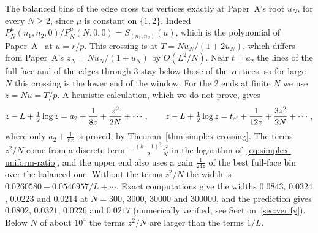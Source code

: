 \begin{remark}\label{rem:K3-finite}
The balanced bins of the edge cross the vertices exactly at Paper~A's root
$u_N$, for every $N\ge2$, since $\mu$ is constant on $\{1,2\}$. Indeed
$P^\mu_N(n_1,n_2,0)/P^\mu_N(N,0,0)=S_{(n_1,n_2)}(u)$, which is the polynomial of
Paper~A~\cite{paperA} at $u=r/p$. This crossing is at $T=Nu_N/(1+2u_N)$, which
differs from Paper~A's $z_N=Nu_N/(1+u_N)$ by $O(L^2/N)$. Near $t=a_2$ the lines
of the full face and of the edges through $3$ stay below those of the vertices,
so for large $N$ this crossing is the lower end of the window. For the 2 ends at
finite $N$ we use $z=Nu=T/p$. A heuristic calculation, which we do not prove,
gives
\[
 z-L+\tfrac12\log z=a_2+\frac1{8z}+\frac{z^2}{2N}+\cdots,\qquad
 z-L+\tfrac12\log z=t_{\rm ef}+\frac1{12z}+\frac{3z^2}{2N}+\cdots,
\]
where only $a_2+\frac1{8z}$ is proved, by Theorem~\ref{thm:simplex-crossing}.
The terms $z^2/N$ come from a discrete term $-\frac{(k-1)^2}2\frac{z^2}N$ in the
logarithm of~\eqref{eq:simplex-uniform-ratio}, and the upper end also uses a gain
$\frac1{24z}$ of the best full-face bin over the balanced one. Without the terms
$z^2/N$ the width is $0.0260580-0.0546957/L+\cdots$. Exact computations give
the widths $0.0843$, $0.0324$, $0.0223$ and $0.0214$ at $N=300$, $3000$,
$30000$ and $300000$, and the prediction gives $0.0802$, $0.0321$, $0.0226$ and
$0.0217$ (numerically verified, see Section~\ref{sec:verify}). Below $N$ of
about $10^4$ the terms $z^2/N$ are larger than the terms $1/L$.
\end{remark}


